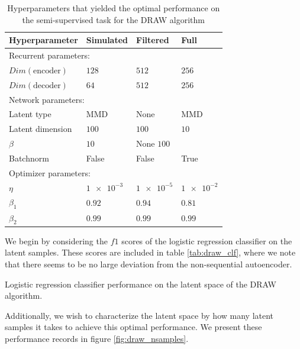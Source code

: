 \begin{table}
\centering
\caption{Hyperparameters that yielded the optimal performance on the semi-supervised task for the DRAW algorithm}\label{tab:best_draw_hyperparams}
\begin{tabular}{llll}
\toprule
Hyperparameter & Simulated & Filtered & Full \\
\midrule
\multicolumn{4}{l}{Recurrent parameters: } \\
\midrule
$Dim(\text{encoder})$ & $128$ & $512$ & $256$ \\
$Dim(\text{decoder})$ & $64$ & $512$ & $256$ \\
\midrule
\multicolumn{4}{l}{Network parameters: } \\
\midrule
Latent type & MMD & None & MMD  \\
Latent dimension & $100$ & $100$ & $10$ \\
$\beta$ & $10$ & None $100$\\
Batchnorm & False & False & True \\
\midrule
\multicolumn{3}{l}{Optimizer parameters: } \\
\midrule
$\eta$ & $\num{1e-3}$ & $\num{1e-5}$ & $\num{1e-2}$ \\
$\beta_1$ & $0.92$ & $0.94$ & $0.81$ \\
$\beta_2$ & $0.99$ & $0.99$ & $0.99$ \\
\bottomrule
\end{tabular}
\end{table}

We begin by considering the $f1$ scores of the logistic regression classifier on the latent samples. These scores are included in table \ref{tab:draw_clf}, where we note that there seems to be no large deviation from the non-sequential autoencoder. 

\begin{table}
\centering
\caption{Logistic regression classifier performance on the latent space of the DRAW algorithm.}\label{tab:draw_clf}

\end{table}

Additionally, we wish to characterize the latent space by how many latent samples it takes to achieve this optimal performance. We present these performance records in figure \ref{fig:draw_nsamples}. 

